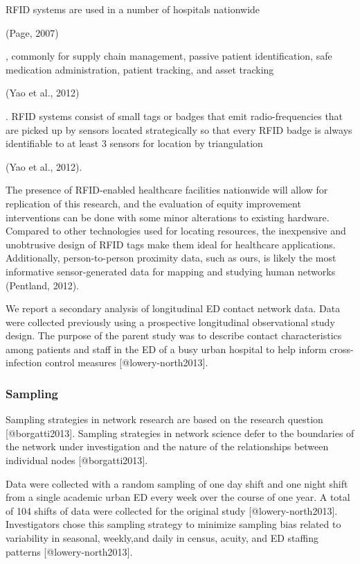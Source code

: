 \documentclass[
]{article}
\begin{document}
RFID systems are used in a number of hospitals nationwide

(Page, 2007)

, commonly for supply chain management, passive patient identification,
safe medication administration, patient tracking, and asset tracking

(Yao et al., 2012)

. RFID systems consist of small tags or badges that emit
radio-frequencies that are picked up by sensors located strategically so
that every RFID badge is always identifiable to at least 3 sensors for
location by triangulation

(Yao et al., 2012).

The presence of RFID-enabled healthcare facilities nationwide will allow
for replication of this research, and the evaluation of equity
improvement interventions can be done with some minor alterations to
existing hardware. Compared to other technologies used for locating
resources, the inexpensive and unobtrusive design of RFID tags make them
ideal for healthcare applications. Additionally, person-to-person
proximity data, such as ours, is likely the most informative
sensor-generated data for mapping and studying human networks (Pentland,
2012).

We report a secondary analysis of longitudinal ED contact network data.
Data were collected previously using a prospective longitudinal
observational study design. The purpose of the parent study was to
describe contact characteristics among patients and staff in the ED of a
busy urban hospital to help inform cross-infection control measures
{[}@lowery-north2013{]}.

\hypertarget{sampling}{%
\subsubsection{Sampling}\label{sampling}}

Sampling strategies in network research are based on the research
question {[}@borgatti2013{]}. Sampling strategies in network science
defer to the boundaries of the network under investigation and the
nature of the relationships between individual nodes
{[}@borgatti2013{]}.

Data were collected with a random sampling of one day shift and one
night shift from a single academic urban ED every week over the course
of one year. A total of 104 shifts of data were collected for the
original study {[}@lowery-north2013{]}. Investigators chose this
sampling strategy to minimize sampling bias related to variability in
seasonal, weekly,and daily in census, acuity, and ED staffing patterns
{[}@lowery-north2013{]}.
\end{document}
